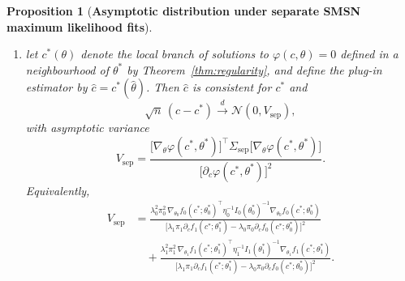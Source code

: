 \documentclass[11pt,a4paper]{article}
\newtheorem{proposition}[theorem]{Proposition}
\theoremstyle{definition}
\theoremstyle{remark}
\newcommand{\1}{\mathbf{1}}
\begin{document}
\begin{proposition}[\textbf{Asymptotic distribution under separate SMSN maximum likelihood fits}]
\begin{enumerate}
\item let $c^*(\theta)$ denote the local branch of solutions to
$\varphi(c,\theta)=0$ defined in a neighbourhood of $\theta^*$ by
Theorem~\ref{thm:regularity}, and define the plug-in estimator by
$\hat c=c^*(\hat\theta)$.
Then $\hat c$ is consistent for $c^*$ and
\begin{equation}
\label{eq:chat-an-separate}
\sqrt{n}\,(\hat c-c^*)
\stackrel{d}{\longrightarrow}
\mathcal N(0,V_{\mathrm{sep}}),
\end{equation}
with asymptotic variance
\begin{equation}
\label{eq:v-sep}
V_{\mathrm{sep}}
=
\frac{
\bigl[\nabla_\theta\varphi(c^*,\theta^*)\bigr]^\top
\Sigma_{\mathrm{sep}}
\bigl[\nabla_\theta\varphi(c^*,\theta^*)\bigr]
}{
\bigl[\partial_c\varphi(c^*,\theta^*)\bigr]^2
}.
\end{equation}
Equivalently,
\begin{equation}
\label{eq:v-sep-expanded}
\begin{split}
V_{\mathrm{sep}}
&=
\frac{
\lambda_0^2\pi_0^2\,
\nabla_{\theta_0}f_0(c^*;\theta_0^*)^\top
\eta_0^{-1}I_0(\theta_0^*)^{-1}
\nabla_{\theta_0}f_0(c^*;\theta_0^*)
}{
\bigl[
\lambda_1\pi_1 \partial_c f_1(c^*;\theta_1^*)
-
\lambda_0\pi_0 \partial_c f_0(c^*;\theta_0^*)
\bigr]^2
}
\\
&\quad+
\frac{
\lambda_1^2\pi_1^2\,
\nabla_{\theta_1}f_1(c^*;\theta_1^*)^\top
\eta_1^{-1}I_1(\theta_1^*)^{-1}
\nabla_{\theta_1}f_1(c^*;\theta_1^*)
}{
\bigl[
\lambda_1\pi_1 \partial_c f_1(c^*;\theta_1^*)
-
\lambda_0\pi_0 \partial_c f_0(c^*;\theta_0^*)
\bigr]^2
}.
\end{split}
\end{equation}
\end{enumerate}
\end{proposition}
\end{document}
